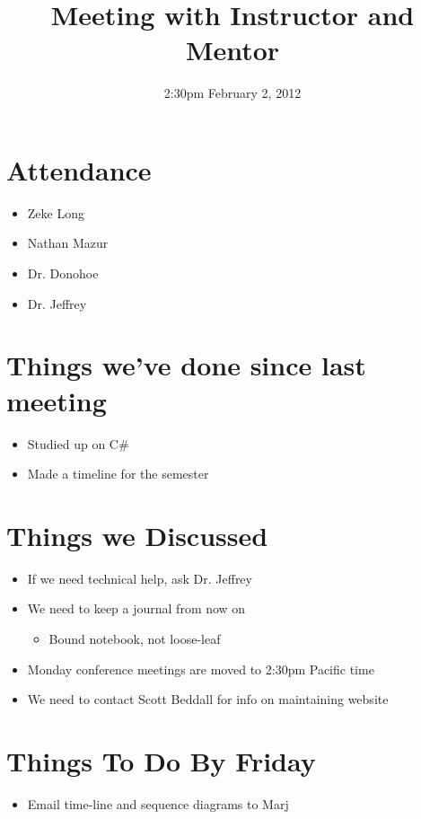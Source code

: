 \documentclass{article}
\begin{document}
\title{Meeting with Instructor and Mentor}
\date{2:30pm February 2, 2012}
\maketitle

\section{Attendance}
\begin{itemize}
\item Zeke Long
\item Nathan Mazur
\item Dr. Donohoe
\item Dr. Jeffrey
\end{itemize}

\section{Things we've done since last meeting}
\begin{itemize}
\item Studied up on C#
\item Made a timeline for the semester
\end{itemize}

\section{Things we Discussed}
\begin{itemize}
\item If we need technical help, ask Dr. Jeffrey
\item We need to keep a journal from now on
	\begin{itemize}
	\item Bound notebook, not loose-leaf
	\end{itemize}
\item Monday conference meetings are moved to 2:30pm Pacific time
\item We need to contact Scott Beddall for info on maintaining website
\end{itemize}

\section{Things To Do By Friday}
\begin{itemize}
\item Email time-line and sequence diagrams to Marj 
\end{itemize}
\end{document}
